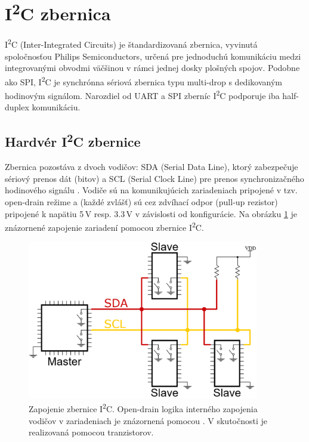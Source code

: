 \section{I\textsuperscript{2}C zbernica}
I\textsuperscript{2}C (Inter-Integrated Circuits) je štandardizovaná zbernica, vyvinutá spoločnosťou Philips Semiconductors, určená pre jednoduchú komunikáciu medzi integrovanými obvodmi \cite{i2cSpec} väčšinou v rámci jednej dosky plošných spojov. Podobne ako SPI, I\textsuperscript{2}C je synchrónna sériová zbernica typu multi-drop s dedikovaným hodinovým signálom. Narozdiel od UART a SPI zberníc I\textsuperscript{2}C podporuje iba half-duplex komunikáciu.

\subsection{Hardvér I\textsuperscript{2}C zbernice}
Zbernica pozostáva z dvoch vodičov: SDA (Serial Data Line), ktorý zabezpečuje sériový prenos dát (bitov) a SCL (Serial Clock Line) pre prenos synchronizačného hodinového signálu \cite{i2cSpec}. Vodiče sú na komunikujúcich zariadeniach pripojené v tzv. open-drain režime a (každé zvlášť) sú cez zdvíhací odpor (pull-up rezistor) pripojené k napätiu 5\,V resp. 3.3\,V v závislosti od konfigurácie. Na obrázku \ref{obr:i2cWiring} je znázornené zapojenie zariadení pomocou zbernice I\textsuperscript{2}C.

\begin{figure}
    \centerline{\includegraphics[width=0.9\textwidth]{images/i2cWiring.png}}
    \caption[Zapojenie zbernice I\textsuperscript{2}C]{Zapojenie zbernice I\textsuperscript{2}C. Open-drain logika interného zapojenia vodičov v zariadeniach je znázornená pomocou . V skutočnosti je realizovaná pomocou tranzistorov.}
    \label{obr:i2cWiring}
\end{figure}

